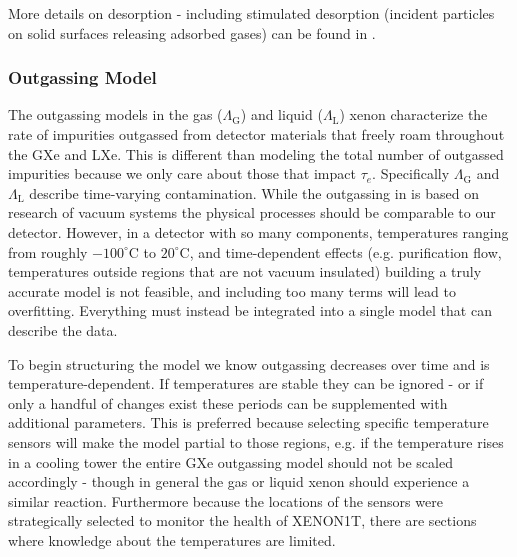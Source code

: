 More details on desorption - including stimulated desorption (incident particles on solid surfaces releasing adsorbed gases) can be
found in .



\subsubsection{Outgassing Model}
\label{subsubsec:electron_lifetime_model_outgassing_model}
The outgassing models in the gas ($\Lambda_{\mathrm{G}}$) and liquid ($\Lambda_{\mathrm{L}}$) xenon characterize the rate of impurities
outgassed
from detector materials that freely roam throughout the GXe and LXe.  This is different than modeling the total number of outgassed
impurities because we only care about those that impact $\tau_e$.  Specifically $\Lambda_{\mathrm{G}}$ and $\Lambda_{\mathrm{L}}$
describe time-varying contamination.  While the outgassing in
 is based on research of vacuum systems the physical processes should be
comparable to our detector.  However, in a detector with so
many components, temperatures ranging from roughly $-100^{\circ} \mathrm{C}$ to $20^{\circ} \mathrm{C}$, and time-dependent effects (e.g.
purification flow, temperatures outside regions that are not vacuum insulated) building a truly accurate model is not
feasible, and including too many terms will lead to overfitting.  Everything must instead be integrated into a single model that can
describe the data.

To begin structuring the model we know outgassing decreases over time and is temperature-dependent.  If temperatures
are stable they can be ignored - or if only a handful of changes exist these periods can be supplemented with
additional parameters.  This is preferred because selecting specific temperature sensors will make the model
partial to those regions, e.g. if the temperature rises in a cooling tower the entire GXe outgassing model should not be scaled
accordingly - though in general the gas or liquid xenon should experience a similar reaction.  Furthermore because the locations of the
sensors were strategically selected to monitor the health of XENON1T, there are sections where knowledge about the temperatures are
limited.

